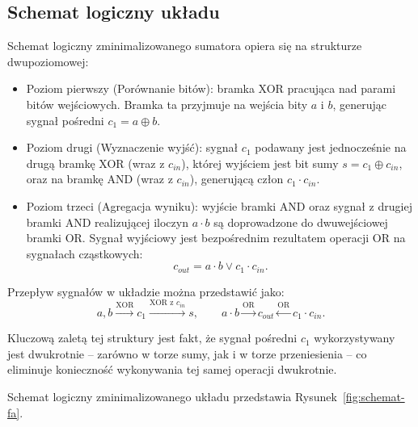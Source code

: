 \documentclass[12pt,a4paper]{article}
\begin{document}
\subsection{Schemat logiczny układu}

Schemat logiczny zminimalizowanego sumatora opiera się na strukturze dwupoziomowej:

\begin{itemize}
    \item Poziom pierwszy (Porównanie bitów): bramka XOR pracująca nad parami bitów wejściowych. Bramka ta przyjmuje na wejścia bity $a$ i $b$, generując sygnał pośredni $c_1 = a \oplus b$.
    \item Poziom drugi (Wyznaczenie wyjść): sygnał $c_1$ podawany jest jednocześnie na drugą bramkę XOR (wraz z $c_{in}$), której wyjściem jest bit sumy $s = c_1 \oplus c_{in}$, oraz na bramkę AND (wraz z $c_{in}$), generującą człon $c_1 \cdot c_{in}$.
    \item Poziom trzeci (Agregacja wyniku): wyjście bramki AND oraz sygnał z drugiej bramki AND realizującej iloczyn $a \cdot b$ są doprowadzone do dwuwejściowej bramki OR. Sygnał wyjściowy jest bezpośrednim rezultatem operacji OR na sygnałach cząstkowych:
    \begin{equation*}
    c_{out} = a \cdot b \vee c_1 \cdot c_{in}.
    \end{equation*}
\end{itemize}

Przepływ sygnałów w układzie można przedstawić jako:
\begin{equation*}
a, b \xrightarrow{\text{XOR}} c_1 \xrightarrow{\text{XOR z } c_{in}} s, \qquad a \cdot b \xrightarrow{\text{OR}} c_{out} \xleftarrow{\text{OR}} c_1 \cdot c_{in}.
\end{equation*}

Kluczową zaletą tej struktury jest fakt, że sygnał pośredni $c_1$ wykorzystywany jest dwukrotnie -- zarówno w torze sumy, jak i w torze przeniesienia -- co eliminuje konieczność wykonywania tej samej operacji dwukrotnie.

Schemat logiczny zminimalizowanego układu przedstawia Rysunek~\ref{fig:schemat-fa}.
\end{document}

